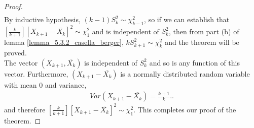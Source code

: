 \documentclass[a4paper,english,12pt]{article}
\begin{document}
\begin{proof}
\begin{align}
\end{align}
By inductive hypothesis, $(k-1)S_k ^2 \sim \chi_{k-1} ^2$, so if we can establish that $[\frac{k}{k+1}][X_{k+1} - \overline{X_k}]^2\sim \chi_{1} ^2$ and is independent of $S_k ^2$, then from part (b) of lemma \ref{lemma_5.3.2_casella_berger}, $kS_{k+1} ^2\sim \chi_k ^2$ and the theorem will be proved.\\
The vector $(X_{k+1},\overline{X_k})$ is independent of $S_k ^2$ and so is any function of this vector. Furthermore, $(X_{k+1} - \overline{X_k})$ is a normally distributed random variable with mean 0 and variance,
\begin{align}
Var(X_{k+1} - \overline{X_k})=\frac{k+1}{k}. \nonumber.
\end{align}
and therefore $[\frac{k}{k+1}][X_{k+1} - \overline{X_k}]^2\sim \chi_{1} ^2$. This completes our proof of the theorem.
\end{proof}
\end{document}
